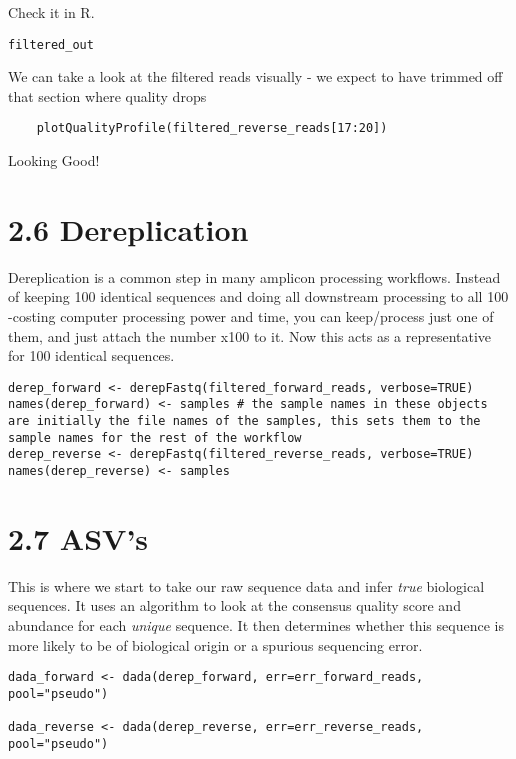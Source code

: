 \documentclass[
]{book}
\begin{document}
Check it in R.

\begin{verbatim}
filtered_out
\end{verbatim}

We can take a look at the filtered reads visually - we expect to have trimmed off that section where quality drops

\begin{verbatim}
    plotQualityProfile(filtered_reverse_reads[17:20])
\end{verbatim}

Looking Good!

\hypertarget{dereplication}{%
\section{2.6 Dereplication}\label{dereplication}}

Dereplication is a common step in many amplicon processing workflows. Instead of keeping 100 identical sequences and doing all downstream processing to all 100 -costing computer processing power and time, you can keep/process just one of them, and just attach the number x100 to it. Now this acts as a representative for 100 identical sequences.

\begin{verbatim}
derep_forward <- derepFastq(filtered_forward_reads, verbose=TRUE)
names(derep_forward) <- samples # the sample names in these objects are initially the file names of the samples, this sets them to the sample names for the rest of the workflow
derep_reverse <- derepFastq(filtered_reverse_reads, verbose=TRUE)
names(derep_reverse) <- samples
\end{verbatim}

\hypertarget{asvs}{%
\section{2.7 ASV's}\label{asvs}}

This is where we start to take our raw sequence data and infer \emph{true} biological sequences.
It uses an algorithm to look at the consensus quality score and abundance for each \emph{unique} sequence. It then determines whether this sequence is more likely to be of biological origin or a spurious sequencing error.

\begin{verbatim}
dada_forward <- dada(derep_forward, err=err_forward_reads, pool="pseudo")

dada_reverse <- dada(derep_reverse, err=err_reverse_reads, pool="pseudo")

\end{verbatim}
\end{document}
